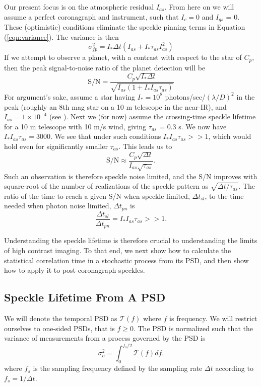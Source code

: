 \documentclass[11pt,preprint]{aastex}
\begin{document}
Our present focus is on the atmospheric residual $I_{as}$.  From here on we will assume a perfect coronagraph and instrument, such that $I_c = 0$ and $I_{qs}$ = 0.  These (optimistic) conditions eliminate the speckle pinning \citep{2001ApJ...558L..71B} terms in Equation (\ref{eqn:variance}).  The variance is then
\begin{equation}
\sigma^2_{fp}  = I_* \Delta t \left(I_{as} + I_* \tau_{as} I_{as}^2 \right)
\label{eqn:variance_as}
\end{equation}
If we attempt to observe a planet, with a contrast with respect to the star of $C_p$, then the peak signal-to-noise ratio of the planet detection will be
\begin{equation}
\mbox{S/N} = \frac{C_p \sqrt{I_* \Delta t}}{ \sqrt{I_{as} (1 + I_*I_{as} \tau_{as})}} 
\end{equation}
For argument's sake, assume a star having $I_* = 10^8$ photons/sec/$(\lambda/D)^2$ in the peak (roughly an 8th mag star on a 10 m telescope in the near-IR), and $I_{as} = 1\times10^{-4}$ (see \citet{2018JATIS...4a9001M}).  Next we (for now) assume the \citet{2005SPIE.5903..170M} crossing-time speckle lifetime for a 10 m telescope with 10 m/s wind, giving $\tau_{as}$ = 0.3 s.  We now have $I_*I_{as} \tau_{as} = 3000$.  We see that under such conditions  $I_*I_{as} \tau_{as} >> 1$, which would hold even for significantly smaller $\tau_{as}$.  This leads us to
\begin{equation}
\mbox{S/N} \approx \frac{C_p \sqrt{\Delta t}}{ I_{as} \sqrt{\tau_{as}}}. 
\end{equation}
Such an observation is therefore speckle noise limited, and the S/N improves with square-root of the number of realizations of the speckle pattern as $\sqrt{\Delta t/ \tau_{as}}$.  The ratio of the time to reach a given S/N when speckle limited, $\Delta t_{sl}$, to the time needed when photon noise limited, $\Delta t_{pn}$ is
\begin{equation}
\frac{\Delta t_{sl}}{\Delta t_{pn}} = I_*I_{as} \tau_{as} >> 1.
\label{eqn:relexptime}
\end{equation}

Understanding the speckle lifetime is therefore crucial to understanding the limits of high contrast imaging.  To that end, we next show how to calculate the statistical correlation time in a stochastic process from its PSD, and then show how to apply it to post-coronagraph speckles.


\subsection{Speckle Lifetime From A PSD}
\label{sec:psd_lifetime}
We will denote the temporal PSD as $\mathcal{T}(f)$ where $f$ is frequency.  We will restrict ourselves to one-sided PSDs, that is $f \ge 0$.  The PSD is normalized such that the variance of measurements from a process governed by the PSD is
\begin{equation}
\sigma_o^2 = \int_{0}^{f_s/2} \mathcal{T}(f) df.
\label{eqn:process_var}
\end{equation}
where $f_s$ is the sampling frequency defined by the sampling rate $\Delta t$ according to $f_s = 1/\Delta t$.
\end{document}
